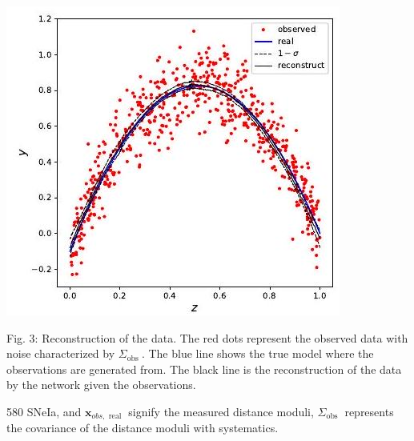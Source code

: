 \documentclass[10pt]{article}
\begin{document}
\includegraphics[max width=\textwidth]{2022_04_28_9be604c658276336b08cg-07}

Fig. 3: Reconstruction of the data. The red dots represent the observed data with noise characterized by $\Sigma_{\text {obs }}$. The blue line shows the true model where the observations are generated from. The black line is the reconstruction of the data by the network given the observations.

580 SNeIa, and $\boldsymbol{x}_{o b s, \text { real }}$ signify the measured distance moduli, $\Sigma_{\text {obs }}$ represents the covariance of the distance moduli with systematics.
\end{document}
